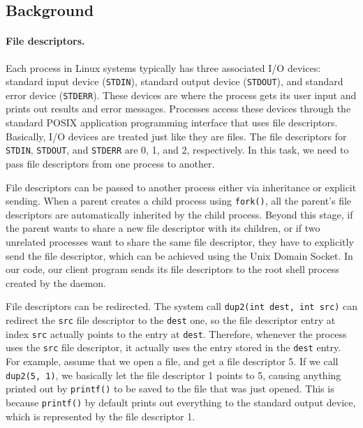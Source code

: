 \subsection{Background}


\paragraph{File descriptors.}


Each process in Linux systems typically has three associated 
I/O devices: standard input device (\texttt{STDIN}), standard output device
(\texttt{STDOUT}), and standard error device (\texttt{STDERR}). These
devices are where the process gets its user input and prints out results and error
messages. Processes access these devices through the standard POSIX application
programming interface that uses file descriptors. Basically, I/O
devices are treated just like they are files. 
The file descriptors for 
\texttt{STDIN},  \texttt{STDOUT}, and \texttt{STDERR} are 0, 1, and 2, respectively. 
In this task, we need to pass file descriptors from one process to another.


File descriptors can be passed to another process  either via
inheritance or explicit sending. When a parent creates a child process using
\texttt{fork()}, all the parent's file descriptors are automatically inherited by 
the child process. Beyond this stage, if the parent wants to share a new file descriptor with
its children, or if two unrelated processes want to share the same file descriptor, they have to
explicitly send the file descriptor, which can be achieved using the Unix Domain Socket. 
In our code, our client program sends its file descriptors to the 
root shell process created by the daemon.


File descriptors can be redirected. The system call \texttt{dup2(int dest, int src)} can 
redirect the \texttt{src} file descriptor to the \texttt{dest} one, so the file descriptor entry at index
\texttt{src} actually points to the entry at \texttt{dest}. Therefore, whenever   
the process uses the \texttt{src} file descriptor, it actually uses the entry stored in 
the \texttt{dest} entry. For example, assume that we open a file, and get a file descriptor 5. 
If we call \texttt{dup2(5, 1)}, we basically let the file descriptor 1 points to 5, causing 
anything printed out by \texttt{printf()} to be saved to the file that was just opened. This is
because \texttt{printf()} by default prints out everything to the standard output device, which
is represented by the file descriptor 1. 


